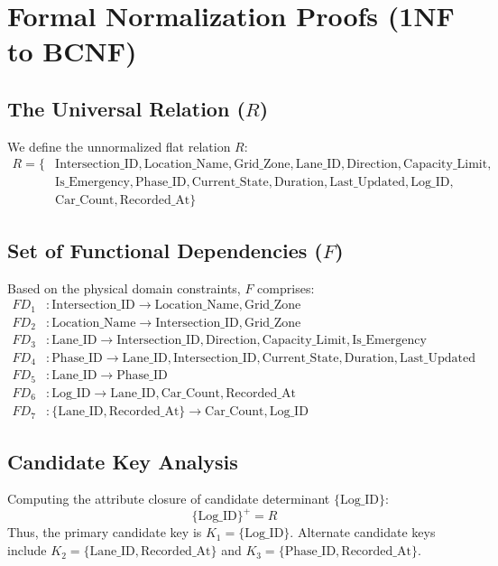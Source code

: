 \documentclass[11pt,a4paper]{report}
\begin{document}
\chapter{Formal Normalization Proofs (1NF to BCNF)}

\section{The Universal Relation ($R$)}
We define the unnormalized flat relation $R$:
\begin{align*}
R = \{ & \text{Intersection\_ID}, \text{Location\_Name}, \text{Grid\_Zone}, \text{Lane\_ID}, \text{Direction}, \text{Capacity\_Limit}, \\
       & \text{Is\_Emergency}, \text{Phase\_ID}, \text{Current\_State}, \text{Duration}, \text{Last\_Updated}, \text{Log\_ID}, \\
       & \text{Car\_Count}, \text{Recorded\_At} \}
\end{align*}

\section{Set of Functional Dependencies ($F$)}
Based on the physical domain constraints, $F$ comprises:
\begin{align}
FD_1 &: \text{Intersection\_ID} \rightarrow \text{Location\_Name}, \text{Grid\_Zone} \\
FD_2 &: \text{Location\_Name} \rightarrow \text{Intersection\_ID}, \text{Grid\_Zone} \\
FD_3 &: \text{Lane\_ID} \rightarrow \text{Intersection\_ID}, \text{Direction}, \text{Capacity\_Limit}, \text{Is\_Emergency} \\
FD_4 &: \text{Phase\_ID} \rightarrow \text{Lane\_ID}, \text{Intersection\_ID}, \text{Current\_State}, \text{Duration}, \text{Last\_Updated} \\
FD_5 &: \text{Lane\_ID} \rightarrow \text{Phase\_ID} \\
FD_6 &: \text{Log\_ID} \rightarrow \text{Lane\_ID}, \text{Car\_Count}, \text{Recorded\_At} \\
FD_7 &: \{\text{Lane\_ID}, \text{Recorded\_At}\} \rightarrow \text{Car\_Count}, \text{Log\_ID}
\end{align}

\section{Candidate Key Analysis}
Computing the attribute closure of candidate determinant $\{\text{Log\_ID}\}$:
$$\{\text{Log\_ID}\}^+ = R$$
Thus, the primary candidate key is $K_1 = \{\text{Log\_ID}\}$. Alternate candidate keys include $K_2 = \{\text{Lane\_ID}, \text{Recorded\_At}\}$ and $K_3 = \{\text{Phase\_ID}, \text{Recorded\_At}\}$.
\end{document}
